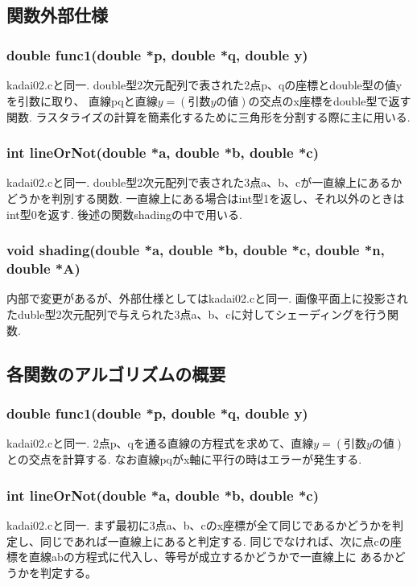 \documentclass[a4j,dvipdfmx]{jsarticle}
\begin{document}

\subsection{関数外部仕様}
\subsubsection{double func1(double *p, double *q, double y)}
kadai02.cと同一.
double型2次元配列で表された2点p、qの座標とdouble型の値yを引数に取り、
直線pqと直線$y=(引数yの値)$の交点のx座標をdouble型で返す関数.
ラスタライズの計算を簡素化するために三角形を分割する際に主に用いる.

\subsubsection{int lineOrNot(double *a, double *b, double *c)}
kadai02.cと同一.
double型2次元配列で表された3点a、b、cが一直線上にあるかどうかを判別する関数.
一直線上にある場合はint型1を返し、それ以外のときはint型0を返す.
後述の関数shadingの中で用いる.

\subsubsection{void shading(double *a, double *b, double *c, double *n, double *A)}
内部で変更があるが、外部仕様としてはkadai02.cと同一.
画像平面上に投影されたduble型2次元配列で与えられた3点a、b、cに対してシェーディングを行う関数.
\subsection{各関数のアルゴリズムの概要}
\subsubsection{double func1(double *p, double *q, double y)}
kadai02.cと同一.
2点p、qを通る直線の方程式を求めて、直線$y=(引数yの値)$との交点を計算する.
なお直線pqがx軸に平行の時はエラーが発生する.

\subsubsection{int lineOrNot(double *a, double *b, double *c)}
kadai02.cと同一.
まず最初に3点a、b、cのx座標が全て同じであるかどうかを判定し、同じであれば一直線上にあると判定する.
同じでなければ、次に点cの座標を直線abの方程式に代入し、等号が成立するかどうかで一直線上に
あるかどうかを判定する。
\end{document}
